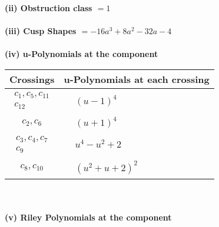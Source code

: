 \documentclass[1p]{elsarticle_modified}
\theoremstyle{definition}
\begin{document}
\flushleft \textbf{(ii) Obstruction class $= 1$}\\~\\
\flushleft \textbf{(iii) Cusp Shapes $= -16 a^3+8 a^2-32 a-4$}\\~\\
\newpage\renewcommand{\arraystretch}{1}
\flushleft \textbf{(iv) u-Polynomials at the component}\newline \\
\begin{tabular}{m{50pt}|m{274pt}}
Crossings & \hspace{64pt}u-Polynomials at each crossing \\
\hline $$\begin{aligned}c_{1},c_{5},c_{11}\\c_{12}\end{aligned}$$&$\begin{aligned}
&(u-1)^4
\end{aligned}$\\
\hline $$\begin{aligned}c_{2},c_{6}\end{aligned}$$&$\begin{aligned}
&(u+1)^4
\end{aligned}$\\
\hline $$\begin{aligned}c_{3},c_{4},c_{7}\\c_{9}\end{aligned}$$&$\begin{aligned}
&u^4- u^2+2
\end{aligned}$\\
\hline $$\begin{aligned}c_{8},c_{10}\end{aligned}$$&$\begin{aligned}
&(u^2+u+2)^2
\end{aligned}$\\
\hline
\end{tabular}\\~\\
\newpage\renewcommand{\arraystretch}{1}
\flushleft \textbf{(v) Riley Polynomials at the component}\newline \\
\end{document}
